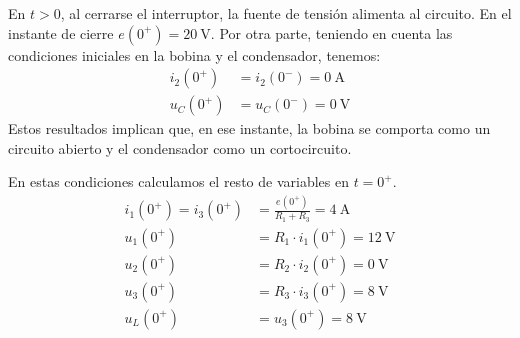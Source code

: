 \smallskip
\begin{minipage}{0.6\linewidth}
En $t > 0$, al cerrarse el interruptor, la fuente de tensión alimenta al circuito. En el instante de cierre $e(0^+) = \qty{20}{\volt}$. Por otra parte, teniendo en cuenta las condiciones iniciales en la bobina y el condensador, tenemos:
\begin{align*}
  i_2(0^+) &= i_2(0^-) = \qty{0}{\ampere}\\
  u_C(0^+) &= u_C(0^-) = \qty{0}{\volt}
\end{align*}
Estos resultados implican que, en ese instante, la bobina se comporta como un circuito abierto y el condensador como un cortocircuito. 
\end{minipage}
\begin{minipage}{0.4\linewidth}
\end{minipage}
\smallskip

En estas condiciones calculamos el resto de variables en $t = 0^+$.
\begin{align*}
  i_1(0^+) = i_3(0^+) &= \frac{e(0^+)}{R_1 + R_3} = \qty{4}{\ampere}\\
  u_1(0^+) &= R_1 \cdot i_1(0^+) = \qty{12}{\volt}\\
  u_2(0^+) &= R_2 \cdot i_2(0^+) = \qty{0}{\volt}\\
  u_3(0^+) &= R_3 \cdot i_3(0^+) = \qty{8}{\volt}\\
  u_L(0^+) &= u_3(0^+) = \qty{8}{\volt}
\end{align*}


